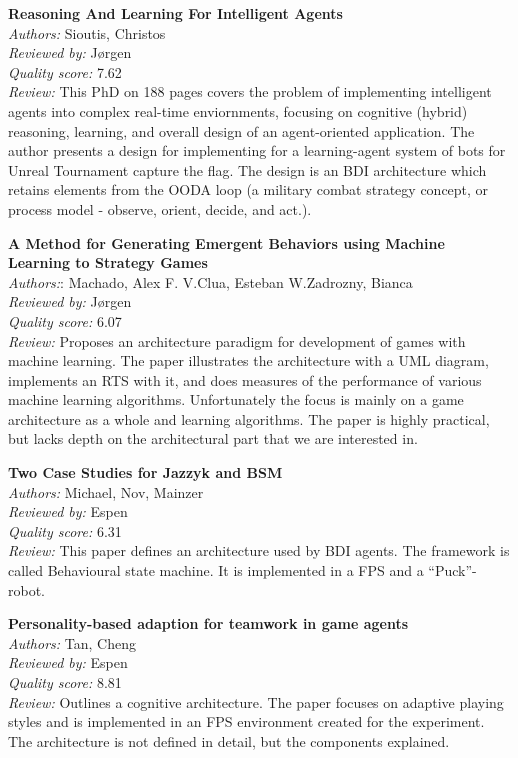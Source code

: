 \textbf{Reasoning And Learning For Intelligent Agents}\\
\textit{Authors:} Sioutis, Christos\\
\textit{Reviewed by:} J{\o}rgen\\
\textit{Quality score:} 7.62\\
\textit{Review:} This PhD on 188 pages covers the problem of implementing intelligent agents into complex real-time enviornments, focusing on cognitive (hybrid) reasoning, learning, and overall design of an agent-oriented application.
The author presents a design for implementing for a learning-agent system of bots for Unreal Tournament capture the flag. The design is an BDI architecture which retains elements from the OODA loop (a military combat strategy concept, or process model - observe, orient, decide, and act.). 


\textbf{A Method for Generating Emergent Behaviors using Machine Learning to Strategy Games}\\
\textit{Authors:}: Machado, Alex F. V.Clua, Esteban W.Zadrozny, Bianca\\
\textit{Reviewed by:} J{\o}rgen\\
\textit{Quality score:} 6.07\\
\textit{Review:} Proposes an architecture paradigm for development of games with machine learning. The paper illustrates the architecture with a UML diagram, implements an RTS with it, and does measures of the performance of various machine learning algorithms. Unfortunately the focus is mainly on a game architecture as a whole and learning algorithms. The paper is highly practical, but lacks depth on the architectural part that we are interested in.

\textbf{Two Case Studies for Jazzyk and BSM}\\
\textit{Authors:} Michael, Nov, Mainzer\\
\textit{Reviewed by:} Espen\\
\textit{Quality score:} 6.31\\
\textit{Review:} This paper defines an architecture used by BDI agents. The framework is called Behavioural state machine. It is implemented in a FPS and a ``Puck''-robot.

\textbf{Personality-based adaption for teamwork in game agents}\\
\textit{Authors:} Tan, Cheng\\
\textit{Reviewed by:} Espen\\
\textit{Quality score:} 8.81\\
\textit{Review:} Outlines a cognitive architecture. The paper focuses on adaptive playing styles and is implemented in an FPS environment created for the experiment. The architecture is not defined in detail, but the components explained. 

